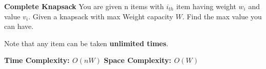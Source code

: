 \textbf{Complete Knapsack}
You are given n items with $i_{th}$ item having weight  $w_i$ and value $v_i$. Given a knapsack with max Weight capacity $W$. Find the max value you can have.

Note that any item can be taken \textbf{unlimited times}.

\textbf{Time Complexity: $O(nW)$}
\textbf{Space Complexity: $O(W)$}
